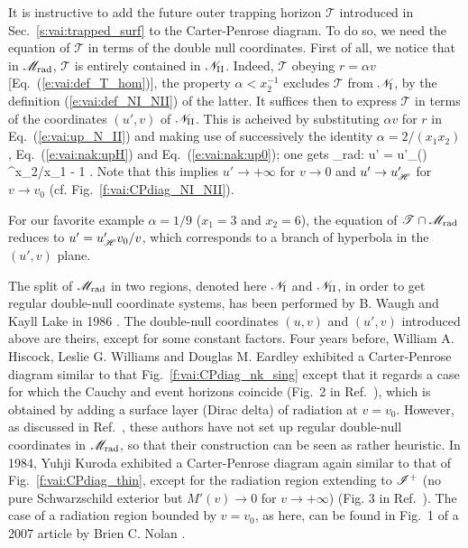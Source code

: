 It is instructive to add the future outer trapping horizon $\mathscr{T}$
introduced in Sec.~\ref{s:vai:trapped_surf}
to the Carter-Penrose diagram. To do so, we need the equation of $\mathscr{T}$
in terms of the double null coordinates. First of all, we notice that in $\mathscr{M}_{\rm rad}$, $\mathscr{T}$ is
entirely contained in $\mathscr{N}_{\rm II}$. Indeed, $\mathscr{T}$ obeying
$r = \alpha v$ [Eq.~(\ref{e:vai:def_T_hom})], the property $\alpha < x_2^{-1}$
excludes $\mathscr{T}$ from $\mathscr{N}_{\rm I}$, by the definition
(\ref{e:vai:def_NI_NII}) of the latter. It suffices then to express  $\mathscr{T}$ in terms of the coordinates $(u',v)$ of  $\mathscr{N}_{\rm II}$.
This is acheived by substituting $\alpha v$ for $r$ in Eq.~(\ref{e:vai:up_N_II}) and making use of successively the identity $\alpha = 2/(x_1 x_2)$,
Eq.~(\ref{e:vai:nak:upH}) and Eq.~(\ref{e:vai:nak:up0}); one gets
\be \label{e:vai:eq_T_NII}
     \cap \M_{\rm rad}:\qquad
    u' = u'_\Hor \left(\right) ^{x_2/x_1 - 1} .
\ee
Note that this implies $u'\to +\infty$ for $v\to 0$ and
$u'\to u'_{\mathscr{H}}$ for $v\to v_0$ (cf. Fig.~\ref{f:vai:CPdiag_NI_NII}).
\begin{example}
For our favorite example $\alpha = 1/9$ ($x_1 = 3$ and $x_2 = 6$),
the equation of $\mathscr{T} \cap \mathscr{M}_{\rm rad}$ reduces
to $u' = u'_{\mathscr{H}} v_0/v$, which corresponds to a branch of hyperbola in the $(u',v)$ plane.
\end{example}

\begin{hist}
The split of $\mathscr{M}_{\rm rad}$ in two regions, denoted here $\mathscr{N}_{\rm I}$
and $\mathscr{N}_{\rm II}$, in order to get regular double-null coordinate
systems, has been performed by
B. Waugh and Kayll Lake in 1986 \cite{WaughL86}.
The double-null coordinates $(u,v)$ and $(u',v)$ introduced above are
theirs, except for some constant factors.
Four years before, William A. Hiscock, Leslie G. Williams and Douglas M. Eardley \cite{HiscoWE82}
exhibited a Carter-Penrose diagram similar to that Fig.~\ref{f:vai:CPdiag_nk_sing}
except that it regards a case for which
the Cauchy and event horizons coincide (Fig.~2 in Ref.~\cite{HiscoWE82}),
which is obtained by adding a surface layer (Dirac delta) of radiation at $v=v_0$.
However, as discussed in Ref.~\cite{WaughL86}, these authors have not set up
regular double-null coordinates in $\mathscr{M}_{\rm rad}$, so that their construction
can be seen as rather heuristic. In 1984, Yuhji Kuroda \cite{Kurod84}
exhibited a Carter-Penrose diagram again similar to that of Fig.~\ref{f:vai:CPdiag_thin}, except
for the radiation region extending to $\mathscr{I}^+$ (no pure Schwarzschild exterior but
$M'(v) \to 0$ for $v\to +\infty$) (Fig. 3 in Ref.~\cite{Kurod84}). The case of a
radiation region bounded by $v = v_0$, as here, can be found in Fig.~1 of a 2007 article by
Brien C. Nolan \cite{Nolan07}.
\end{hist}


